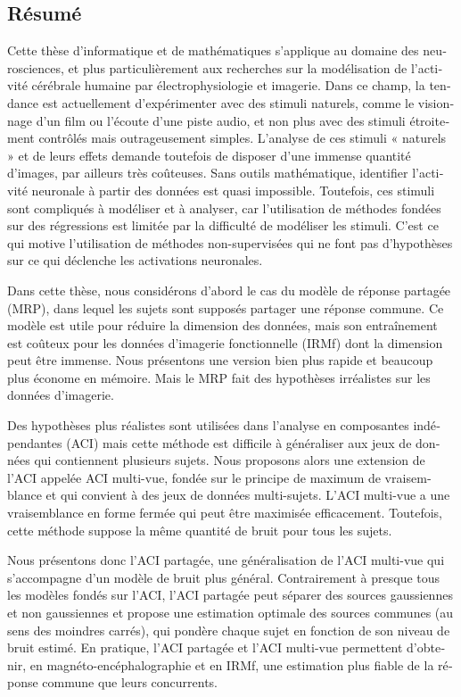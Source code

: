 \begin{otherlanguage}{french}
\chapter*{Résumé}
Cette thèse d'informatique et de mathématiques s'applique au domaine des neurosciences, et plus particulièrement aux recherches sur la modélisation de l'activité cérébrale humaine par électrophysiologie et imagerie.
%
Dans ce champ, la tendance est actuellement d’expérimenter avec des stimuli naturels, comme le visionnage d’un film ou l’écoute d’une piste audio, et non plus avec des stimuli étroitement contrôlés mais outrageusement simples.
%
L’analyse de ces stimuli « naturels » et de leurs effets demande toutefois de disposer d’une immense quantité d’images, par ailleurs très coûteuses. Sans outils mathématique, identifier l'activité neuronale à partir des données est quasi impossible.
%
Toutefois, ces stimuli sont compliqués à modéliser et à analyser, car l'utilisation de méthodes fondées sur des régressions est limitée par la difficulté de modéliser les stimuli.
%
C'est ce qui motive l'utilisation de méthodes non-supervisées qui ne font pas d'hypothèses sur ce qui déclenche les activations neuronales.

Dans cette thèse, nous considérons d'abord le cas du modèle de réponse partagée (MRP), dans lequel les sujets sont supposés partager une réponse commune. Ce modèle est utile pour réduire la dimension des données, mais son entraînement est coûteux pour les données d'imagerie fonctionnelle (IRMf) dont la dimension peut être immense.
%
Nous présentons une version bien plus rapide et beaucoup plus économe en mémoire. Mais le MRP fait des hypothèses irréalistes sur les données d'imagerie.

Des hypothèses plus réalistes sont utilisées dans l'analyse en composantes indépendantes (ACI) mais cette méthode est difficile à généraliser aux jeux de données qui contiennent plusieurs sujets.
%
Nous proposons alors une extension de l'ACI appelée ACI multi-vue, fondée sur le principe de maximum de vraisemblance
et qui convient à des jeux de données multi-sujets.
%
L’ACI multi-vue a une vraisemblance en forme fermée qui peut être maximisée efficacement. Toutefois, cette méthode suppose la même quantité de bruit pour tous les sujets.

Nous présentons donc l’ACI partagée, une généralisation de l’ACI multi-vue qui s'accompagne d'un modèle de bruit plus général.
%
Contrairement à presque tous les modèles fondés sur l'ACI, l’ACI partagée peut séparer des sources gaussiennes et non gaussiennes et propose une estimation optimale des sources communes (au sens des moindres carrés), qui pondère chaque sujet en fonction de son niveau de bruit estimé.
%
En pratique, l’ACI partagée et l’ACI multi-vue permettent d'obtenir, en magnéto-encéphalographie et en IRMf, une estimation plus fiable de la réponse commune que leurs concurrents.


\end{otherlanguage}
